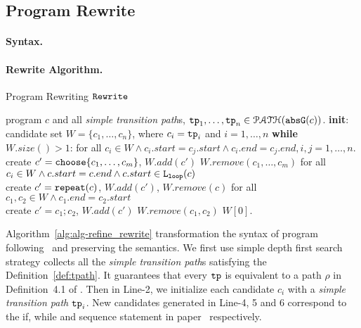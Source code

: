 \subsection{Program Rewrite}
\paragraph{Syntax.}

\paragraph{Rewrite Algorithm.}
\begin{algorithm}
  \caption{Program Rewriting $\mathtt{Rewrite}$}
  \label{alg:alg-refine_rewrite}
  \begin{algorithmic}[1]
    \REQUIRE program $c$ and all \emph{simple transition path}s, $\mathtt{tp}_1, \ldots, \mathtt{tp}_n \in \mathcal{PATH}(\mathtt{abs}{\mathtt{G}}(c))$.
    \STATE \textbf{init}: candidate set $W = \{c_1, \ldots, c_n\}$, where $c_i = \mathtt{tp}_i$ and $i = 1, \ldots, n$
    \STATE \textbf{while} $W.size()> 1$:
    \STATE \quad 
    for all $c_i \in W \land c_i.start = c_j.start \land c_i.end = c_j.end, i, j = 1, \ldots, n$.
    \\ \quad create $c' = \rpchoose{c_1, \ldots, c_m}$, \qquad  $W.add(c')$ \qquad $W.remove(c_1, \ldots, c_m)$
    \STATE
    \quad for all $c_i \in W \land c.start = c.end \land c.start \in \mathtt{L}_{\mathtt{loop}}(c)$
    \\ \quad create $c' = \mathtt{repeat}(c)$, \qquad $W.add(c')$, \qquad $W.remove(c)$
    \STATE \quad for all $c_1, c_2 \in W \land c_1.end = c_2.start$
    \\
    \quad create $c' = c_1; c_2$, \quad $W.add(c')$ \qquad $W.remove(c_1, c_2)$
    \RETURN $W[0]$.
  \end{algorithmic}
  \end{algorithm}
%
Algorithm~\ref{alg:alg-refine_rewrite} transformation the syntax of program following~\cite{GulwaniJK09} and preserving the semantics.
We first use simple depth first search strategy collects all the \emph{simple transition path}s satisfying the Definition~\ref{def:tpath}. It guarantees that every $\mathtt{tp}$ is equivalent to a path $\rho$ in Definition~4.1 of \cite{GulwaniJK09}.
Then
in Line-2, we initialize each candidate $c_i$ with a \emph{simple transition path} $\mathtt{tp}_i$. New candidates generated in Line-4, 5 and 6 correspond to the if,
while and sequence statement in paper~\cite{GulwaniJK09} respectively.

